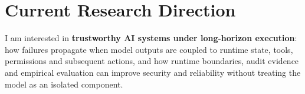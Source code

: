 \documentclass[10pt,a4paper]{article}
\begin{document}
\section{Current Research Direction}
I am interested in \textbf{trustworthy AI systems under long-horizon execution}: how failures propagate when model outputs are coupled to runtime state, tools, permissions and subsequent actions, and how runtime boundaries, audit evidence and empirical evaluation can improve security and reliability without treating the model as an isolated component.
\end{document}
